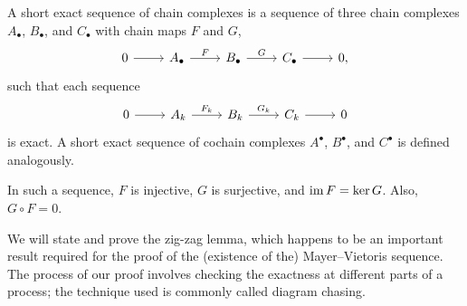 \documentclass[a4paper,12pt]{article}
\begin{document}
\begin{definition}\label{def:short_exact_sequence_of_(co)chain_complexes}
    A short exact sequence of chain complexes is a sequence of three chain complexes $A_\bullet$, $B_\bullet$, and $C_\bullet$ with chain maps $F$ and $G$,
    \[\begin{tikzcd}
	0 & {A_\bullet} & {B_\bullet} & {C_\bullet} & 0,
	\arrow[from=1-1, to=1-2]
	\arrow["F", from=1-2, to=1-3]
	\arrow["G", from=1-3, to=1-4]
	\arrow[from=1-4, to=1-5]
    \end{tikzcd}\]
    such that each sequence
    \[\begin{tikzcd}
	0 & {A_k} & {B_k} & {C_k} & 0
	\arrow[from=1-1, to=1-2]
	\arrow["{F_k}", from=1-2, to=1-3]
	\arrow["{G_k}", from=1-3, to=1-4]
	\arrow[from=1-4, to=1-5]
    \end{tikzcd}\]
    is exact.
    A short exact sequence of cochain complexes $A^\bullet$, $B^\bullet$, and $C^\bullet$ is defined analogously.
\end{definition}
\begin{remark}
    In such a sequence, $F$ is injective, $G$ is surjective, and $\operatorname{im} F = \ker G$.
    Also, $G \circ F = 0$.
\end{remark}
We will state and prove the zig-zag lemma, which happens to be an important result required for the proof of the (existence of the) Mayer--Vietoris sequence.
The process of our proof involves checking the exactness at different parts of a process; the technique used is commonly called diagram chasing.
\end{document}
